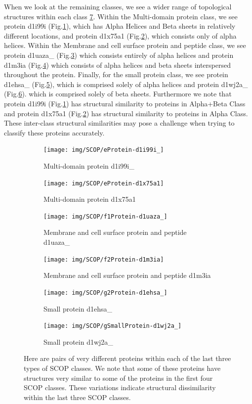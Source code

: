 \documentclass[12pt, a4paper, twocolumn, fullpage]{article}
\theoremstyle{plain}
\theoremstyle{definition}
\theoremstyle{remark}
\begin{document}
When we look at the remaining classes, we see a wider range of topological structures within each class \ref{fig:SCOPClass-efg}. Within the Multi-domain protein class, we see protein d1i99i (Fig.\ref{e1}), which has Alpha Helices and Beta sheets in relatively different locations, and protein d1x75a1 (Fig.\ref{e2}), which consists only of alpha helices. Within the Membrane and cell surface protein and peptide class, we see protein d1uaza\_ (Fig.\ref{f1}) which consists entirely of alpha helices and protein d1m3ia (Fig.\ref{f2}) which consists of alpha helices and beta sheets interspersed throughout the protein. Finally, for the small protein class, we see protein d1ehsa\_ (Fig.\ref{g1}), which is comprised solely of alpha helices and protein d1wj2a\_ (Fig.\ref{g2}). which is comprised solely of beta sheets. Furthermore we note that protein d1i99i (Fig.\ref{e1}) has structural similarity to proteins in Alpha+Beta Class and protein d1x75a1 (Fig.\ref{e2}) has structural similarity to proteins in Alpha Class. These inter-class structural similarities may pose a challenge when trying to classify these proteins accurately.

\begin{figure}
\centering
\begin{subfigure}{.5\textwidth}
  \centering
  \texttt{[image: img/SCOP/eProtein-d1i99i\_]}
  \caption{Multi-domain protein d1i99i\_}
  \label{e1}
\end{subfigure}%
\begin{subfigure}{.5\textwidth}
  \centering
  \texttt{[image: img/SCOP/eProtein-d1x75a1]}
  \caption{Multi-domain protein d1x75a1}
  \label{e2}
\end{subfigure}

\begin{subfigure}{.45\textwidth}
  \centering
  \texttt{[image: img/SCOP/f1Protein-d1uaza\_]}
  \caption{Membrane and cell surface protein and peptide d1uaza\_}
  \label{f1}
\end{subfigure}%
\begin{subfigure}{.45\textwidth}
  \centering
  \texttt{[image: img/SCOP/f2Protein-d1m3ia]}
  \caption{Membrane and cell surface protein and peptide d1m3ia}
  \label{f2}
\end{subfigure}%

\begin{subfigure}{.5\textwidth}
  \centering
  \texttt{[image: img/SCOP/g2Protein-d1ehsa\_]}
  \caption{Small protein d1ehsa\_}
  \label{g1}
\end{subfigure}%
\begin{subfigure}{.5\textwidth}
  \centering
  \texttt{[image: img/SCOP/gSmallProtein-d1wj2a\_]}
  \caption{Small protein d1wj2a\_}
  \label{g2}
\end{subfigure}%
\caption{Here are pairs of very different proteins within each of the last three types of SCOP classes. We note that some of these proteins have structures very similar to some of the proteins in the first four SCOP classes. These variations indicate structural dissimilarity within the last three SCOP classes.}
\label{fig:SCOPClass-efg}
\end{figure}
\end{document}
